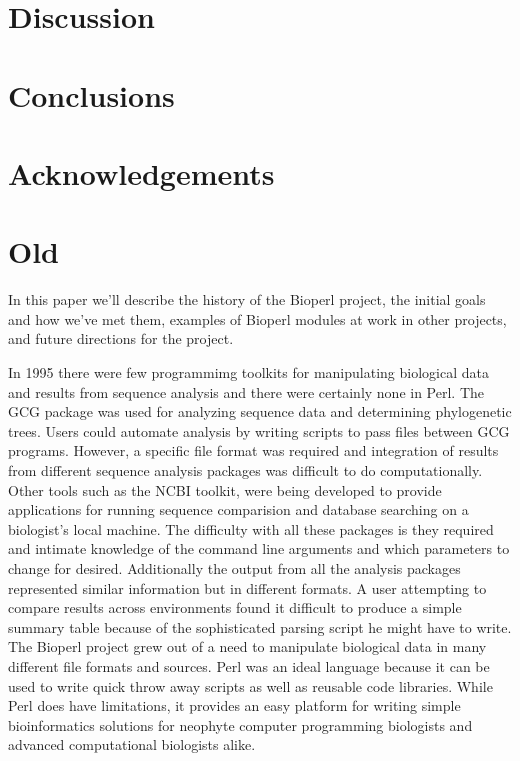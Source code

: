 \documentclass{article}
\begin{document}
\begin{twocolumn}
\section{Discussion}

\section{Conclusions}

\section{Acknowledgements}

\section{Old}

In this paper we'll describe the history of the Bioperl project, the
initial goals and how we've met them, examples of Bioperl modules at
work in other projects, and future directions for the project.

In 1995 there were few programmimg toolkits for manipulating
biological data and results from sequence analysis and there were
certainly none in Perl.  The GCG package \cite{GCG} was used for
analyzing sequence data and determining phylogenetic trees.  Users
could automate analysis by writing scripts to pass files between GCG
programs.  However, a specific file format was required and
integration of results from different sequence analysis packages was
difficult to do computationally. Other tools such as the NCBI toolkit,
were being developed to provide applications for running sequence
comparision and database searching on a biologist's local machine.
The difficulty with all these packages is they required and intimate
knowledge of the command line arguments and which parameters to change
for desired.  Additionally the output from all the analysis packages
represented similar information but in different formats.  A user
attempting to compare results across environments found it difficult
to produce a simple summary table because of the sophisticated parsing
script he might have to write. \\

The Bioperl project grew out of a need to manipulate biological data
in many different file formats and sources.  Perl was an ideal
language because it can be used to write quick throw away scripts as
well as reusable code libraries.  While Perl does have limitations, it
provides an easy platform for writing simple bioinformatics solutions
for neophyte computer programming biologists and advanced
computational biologists alike.


\end{twocolumn}
\end{document}
